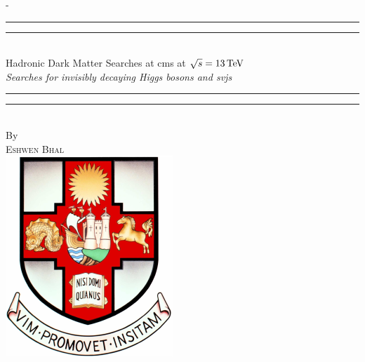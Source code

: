 %
%
% 
%
%
\begin{titlingpage}
\begin{SingleSpace}
\calccentering{\unitlength} 
\begin{adjustwidth*}{\unitlength}{-\unitlength}
\vspace*{13mm}
\begin{center}
\rule[0.5ex]{\linewidth}{2pt}\vspace*{-\baselineskip}\vspace*{3.2pt}
\rule[0.5ex]{\linewidth}{1pt}\\[\baselineskip]
{\HUGE Hadronic Dark Matter Searches at \acrshort{cms} at $\sqrt{s} = \text{13\ensuremath{\,\text{Te\hspace{-.08em}V}}}$}\\[4mm] %
{\Large \textit{Searches for invisibly decaying Higgs bosons and \glspl{svj}}}\\ %
\rule[0.5ex]{\linewidth}{1pt}\vspace*{-\baselineskip}\vspace{3.2pt}
\rule[0.5ex]{\linewidth}{2pt}\\
\vspace{6.5mm}
{\large By}\\
\vspace{6.5mm}
{\large\textsc{Eshwen Bhal}}\\  %
\vspace{11mm}
\includegraphics[scale=0.6]{logos/bristolcrest_colour}\\  %

\end{center}
\end{adjustwidth*}
\end{SingleSpace}
\end{titlingpage}
